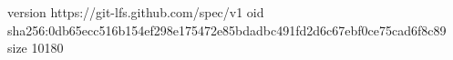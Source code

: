 version https://git-lfs.github.com/spec/v1
oid sha256:0db65ecc516b154ef298e175472e85bdadbc491fd2d6c67ebf0ce75cad6f8c89
size 10180

